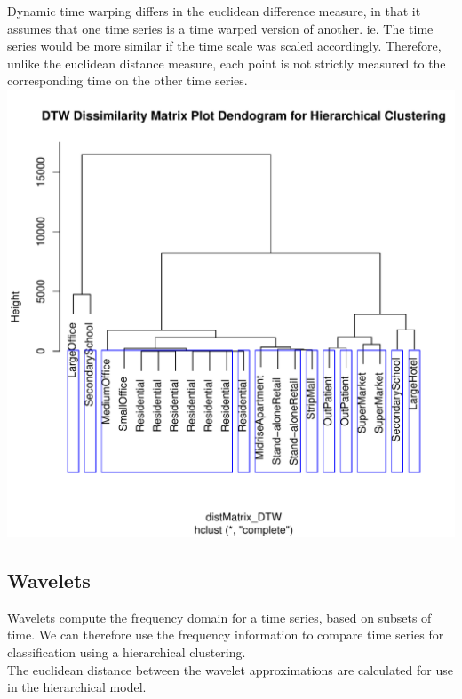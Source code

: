 \documentclass[12pt]{article}\usepackage[]{graphicx}\usepackage[]{color}
\makeatletter
\def\maxwidth{ %
  \ifdim\Gin@nat@width>\linewidth
    \linewidth
  \else
    \Gin@nat@width
  \fi
}
\newenvironment{knitrout}{}{} %
\makeatother
\begin{document}
Dynamic time warping differs in the euclidean difference measure, in that it assumes that one time series is a time warped version of another. ie. The time series would be more similar if the time scale was scaled accordingly. Therefore, unlike the euclidean distance measure, each point is not strictly measured to the corresponding time on the other time series. 
\begin{knitrout}
\color{fgcolor}
\includegraphics[width=\maxwidth]{figure/dynamic_time_warping-1} 

\end{knitrout}



\subsection{Wavelets}


Wavelets compute the frequency domain for a time series, based on subsets of time. We can therefore use the frequency information to compare time series for classification using a hierarchical clustering. \\

The euclidean distance between the wavelet approximations are calculated for use in the hierarchical model. 
\end{document}
